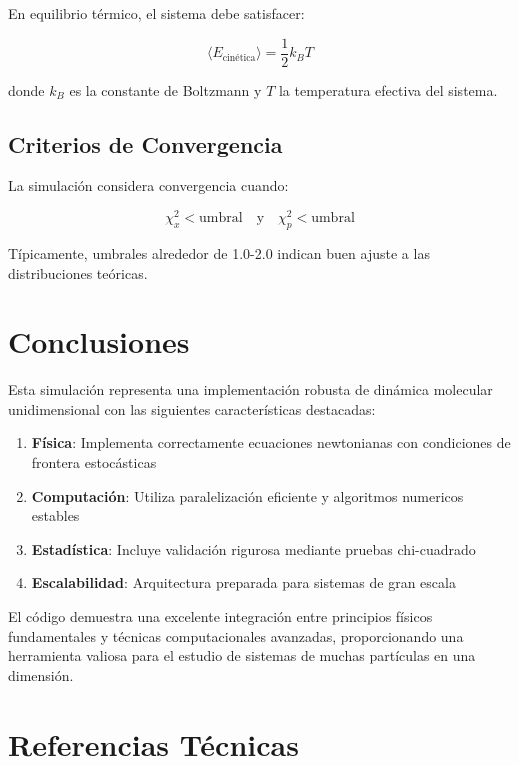 \documentclass[12pt,a4paper]{article}
\begin{document}
En equilibrio térmico, el sistema debe satisfacer:

\begin{equation}
\langle E_{\text{cinética}} \rangle = \frac{1}{2} k_B T
\end{equation}

donde $k_B$ es la constante de Boltzmann y $T$ la temperatura efectiva del sistema.

\subsection{Criterios de Convergencia}

La simulación considera convergencia cuando:

\begin{equation}
\chi^2_x < \text{umbral} \quad \text{y} \quad \chi^2_p < \text{umbral}
\end{equation}

Típicamente, umbrales alrededor de 1.0-2.0 indican buen ajuste a las distribuciones teóricas.

\section{Conclusiones}

Esta simulación representa una implementación robusta de dinámica molecular unidimensional con las siguientes características destacadas:

\begin{enumerate}
    \item \textbf{Física}: Implementa correctamente ecuaciones newtonianas con condiciones de frontera estocásticas
    \item \textbf{Computación}: Utiliza paralelización eficiente y algoritmos numericos estables
    \item \textbf{Estadística}: Incluye validación rigurosa mediante pruebas chi-cuadrado
    \item \textbf{Escalabilidad}: Arquitectura preparada para sistemas de gran escala
\end{enumerate}

El código demuestra una excelente integración entre principios físicos fundamentales y técnicas computacionales avanzadas, proporcionando una herramienta valiosa para el estudio de sistemas de muchas partículas en una dimensión.

\section{Referencias Técnicas}
\end{document}

